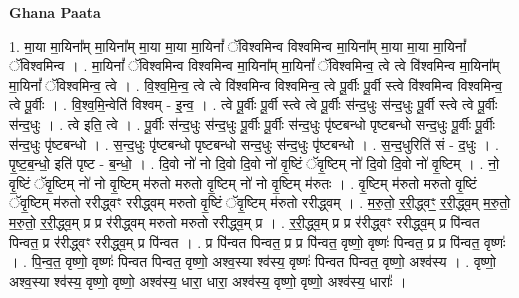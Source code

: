 \documentclass[17pt]{extarticle}
\begin{document}
\textbf{Ghana Paata } \newline

1. मा॒या मा॒यिना᳚म् मा॒यिना᳚म् मा॒या मा॒या मा॒यिनां᳚ ॅविश्वमिन्व विश्वमिन्व मा॒यिना᳚म् मा॒या मा॒या मा॒यिनां᳚ ॅविश्वमिन्व । . मा॒यिनां᳚ ॅविश्वमिन्व विश्वमिन्व मा॒यिना᳚म् मा॒यिनां᳚ ॅविश्वमिन्व॒ त्वे त्वे वि॑श्वमिन्व मा॒यिना᳚म् मा॒यिनां᳚ ॅविश्वमिन्व॒ त्वे । . वि॒श्व॒मि॒न्व॒ त्वे त्वे वि॑श्वमिन्व विश्वमिन्व॒ त्वे पू॒र्वीः पू॒र्वी स्त्वे वि॑श्वमिन्व विश्वमिन्व॒ त्वे पू॒र्वीः । . वि॒श्व॒मि॒न्वेति॑ विश्वम् - इ॒न्व॒ । . त्वे पू॒र्वीः पू॒र्वी स्त्वे त्वे पू॒र्वीः स॑न्द॒धुः स॑न्द॒धुः पू॒र्वी स्त्वे त्वे पू॒र्वीः स॑न्द॒धुः । . त्वे इति॒ त्वे । . पू॒र्वीः स॑न्द॒धुः स॑न्द॒धुः पू॒र्वीः पू॒र्वीः स॑न्द॒धुः पृ॑ष्टबन्धो पृष्टबन्धो सन्द॒धुः पू॒र्वीः पू॒र्वीः स॑न्द॒धुः पृ॑ष्टबन्धो । . स॒न्द॒धुः पृ॑ष्टबन्धो पृष्टबन्धो सन्द॒धुः स॑न्द॒धुः पृ॑ष्टबन्धो । . स॒न्द॒धुरिति॑ सं - द॒धुः । . पृ॒ष्ट॒ब॒न्धो॒ इति॑ पृष्ट - ब॒न्धो॒ । . दि॒वो नो॑ नो दि॒वो दि॒वो नो॑ वृ॒ष्टिं ॅवृ॒ष्टिम् नो॑ दि॒वो दि॒वो नो॑ वृ॒ष्टिम् । . नो॒ वृ॒ष्टिं ॅवृ॒ष्टिम् नो॑ नो वृ॒ष्टिम् म॑रुतो मरुतो वृ॒ष्टिम् नो॑ नो वृ॒ष्टिम् म॑रुतः । . वृ॒ष्टिम् म॑रुतो मरुतो वृ॒ष्टिं ॅवृ॒ष्टिम् म॑रुतो ररीद्ध्वꣳ ररीद्ध्वम् मरुतो वृ॒ष्टिं ॅवृ॒ष्टिम् म॑रुतो ररीद्ध्वम् । . म॒रु॒तो॒ र॒री॒द्ध्वꣳ॒॒ र॒री॒द्ध्व॒म् म॒रु॒तो॒ म॒रु॒तो॒ र॒री॒द्ध्व॒म् प्र प्र र॑रीद्ध्वम् मरुतो मरुतो ररीद्ध्व॒म् प्र । . र॒री॒द्ध्व॒म् प्र प्र र॑रीद्ध्वꣳ ररीद्ध्व॒म् प्र पि॑न्वत पिन्वत॒ प्र र॑रीद्ध्वꣳ ररीद्ध्व॒म् प्र पि॑न्वत । . प्र पि॑न्वत पिन्वत॒ प्र प्र पि॑न्वत॒ वृष्णो॒ वृष्णः॑ पिन्वत॒ प्र प्र पि॑न्वत॒ वृष्णः॑ । . पि॒न्व॒त॒ वृष्णो॒ वृष्णः॑ पिन्वत पिन्वत॒ वृष्णो॒ अश्व॒स्या श्व॑स्य॒ वृष्णः॑ पिन्वत पिन्वत॒ वृष्णो॒ अश्व॑स्य । . वृष्णो॒ अश्व॒स्या श्व॑स्य॒ वृष्णो॒ वृष्णो॒ अश्व॑स्य॒ धारा॒ धारा॒ अश्व॑स्य॒ वृष्णो॒ वृष्णो॒ अश्व॑स्य॒ धाराः᳚ । \newline
\end{document}
